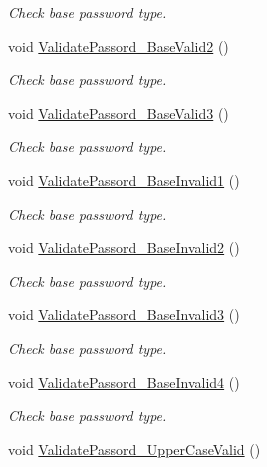 \begin{DoxyCompactItemize}
\begin{DoxyCompactList}\small\item\em Check base password type. \end{DoxyCompactList}\item 
void \mbox{\hyperlink{class_a_c_tests_1_1_tests_1_1_regex_a954c0141915ab29ceb0e2c05f0bea2f1}{Validate\+Passord\+\_\+\+Base\+Valid2}} ()
\begin{DoxyCompactList}\small\item\em Check base password type. \end{DoxyCompactList}\item 
void \mbox{\hyperlink{class_a_c_tests_1_1_tests_1_1_regex_a6545c48fb496df48a39610b0f091b677}{Validate\+Passord\+\_\+\+Base\+Valid3}} ()
\begin{DoxyCompactList}\small\item\em Check base password type. \end{DoxyCompactList}\item 
void \mbox{\hyperlink{class_a_c_tests_1_1_tests_1_1_regex_a5eaced5022d4eae7d3a984151140212f}{Validate\+Passord\+\_\+\+Base\+Invalid1}} ()
\begin{DoxyCompactList}\small\item\em Check base password type. \end{DoxyCompactList}\item 
void \mbox{\hyperlink{class_a_c_tests_1_1_tests_1_1_regex_a3c6a5c216cef0d3ebe7e0a26b3199336}{Validate\+Passord\+\_\+\+Base\+Invalid2}} ()
\begin{DoxyCompactList}\small\item\em Check base password type. \end{DoxyCompactList}\item 
void \mbox{\hyperlink{class_a_c_tests_1_1_tests_1_1_regex_a8d3cff2c459c422de5a6162da2e29c82}{Validate\+Passord\+\_\+\+Base\+Invalid3}} ()
\begin{DoxyCompactList}\small\item\em Check base password type. \end{DoxyCompactList}\item 
void \mbox{\hyperlink{class_a_c_tests_1_1_tests_1_1_regex_a913dfa4f230e179f8a16b43efb26e24b}{Validate\+Passord\+\_\+\+Base\+Invalid4}} ()
\begin{DoxyCompactList}\small\item\em Check base password type. \end{DoxyCompactList}\item 
void \mbox{\hyperlink{class_a_c_tests_1_1_tests_1_1_regex_afb5497f25802c0962c7197ac44356b47}{Validate\+Passord\+\_\+\+Upper\+Case\+Valid}} ()

\end{DoxyCompactItemize}
